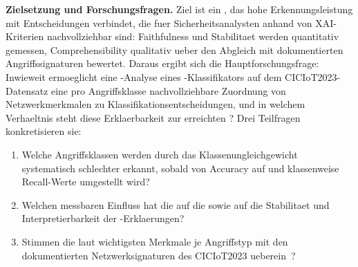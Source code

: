 \textbf{Zielsetzung und Forschungsfragen.}
Ziel ist ein \ids{}, das hohe Erkennungsleistung mit Entscheidungen verbindet, die fuer
Sicherheitsanalysten anhand von XAI-Kriterien nachvollziehbar sind: Faithfulness und
Stabilitaet werden quantitativ gemessen, Comprehensibility qualitativ ueber den Abgleich mit
dokumentierten Angriffssignaturen bewertet.
Daraus ergibt sich die Hauptforschungsfrage: Inwieweit ermoeglicht eine \shap{}-Analyse eines
\gb{}-Klassifikators auf dem CICIoT2023-Datensatz eine pro Angriffsklasse nachvollziehbare
Zuordnung von Netzwerkmerkmalen zu Klassifikationsentscheidungen, und in welchem Verhaeltnis
steht diese Erklaerbarkeit zur erreichten \ba{}?
Drei Teilfragen konkretisieren sie:
\begin{enumerate}
\setlength{\itemsep}{1pt}\setlength{\parskip}{0pt}\setlength{\topsep}{2pt}
\item Welche Angriffsklassen werden durch das Klassenungleichgewicht systematisch schlechter
erkannt, sobald von Accuracy auf \ba{} und klassenweise Recall-Werte umgestellt wird?
\item Welchen messbaren Einfluss hat die \pca{} auf die \ba{} sowie auf die Stabilitaet und
Interpretierbarkeit der \shap{}-Erklaerungen?
\item Stimmen die laut \shap{} wichtigsten Merkmale je Angriffstyp mit den dokumentierten
Netzwerksignaturen des CICIoT2023 ueberein~\cite{neto2023ciciot2023}?
\end{enumerate}
